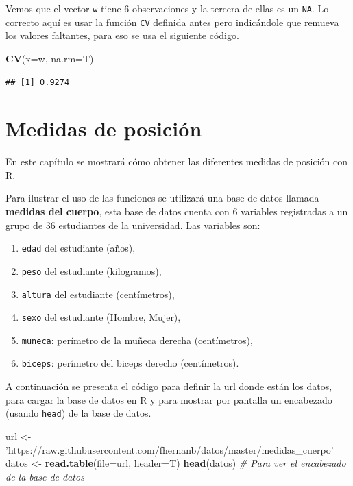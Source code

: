 \documentclass[10pt,]{krantz}
\makeatletter
\newenvironment{Shaded}{\begin{snugshade}}{\end{snugshade}}
\newcommand{\KeywordTok}[1]{\textcolor[rgb]{0.13,0.29,0.53}{\textbf{{#1}}}}
\newcommand{\DataTypeTok}[1]{\textcolor[rgb]{0.13,0.29,0.53}{{#1}}}
\newcommand{\StringTok}[1]{\textcolor[rgb]{0.31,0.60,0.02}{{#1}}}
\newcommand{\CommentTok}[1]{\textcolor[rgb]{0.56,0.35,0.01}{\textit{{#1}}}}
\newcommand{\NormalTok}[1]{{#1}}
\providecommand{\tightlist}{%
  \setlength{\itemsep}{0pt}\setlength{\parskip}{0pt}}
\let\proglang=\textsf
\newenvironment{kframe}{%
\medskip{}
\setlength{\fboxsep}{.8em}
 \def\at@end@of@kframe{}%
 \ifinner\ifhmode%
  \def\at@end@of@kframe{\end{minipage}}%
  \begin{minipage}{\columnwidth}%
 \fi\fi%
 \def\FrameCommand##1{\hskip\@totalleftmargin \hskip-\fboxsep
 \colorbox{shadecolor}{##1}\hskip-\fboxsep
     \hskip-\linewidth \hskip-\@totalleftmargin \hskip\columnwidth}%
 \MakeFramed {\advance\hsize-\width
   \@totalleftmargin\z@ \linewidth\hsize
   \@setminipage}}%
 {\par\unskip\endMakeFramed%
 \at@end@of@kframe}
\renewenvironment{Shaded}{\begin{kframe}}{\end{kframe}}
\makeatother
\begin{document}
Vemos que el vector \texttt{w} tiene 6 observaciones y la tercera de
ellas es un \texttt{NA}. Lo correcto aquí es usar la función \texttt{CV}
definida antes pero indicándole que remueva los valores faltantes, para
eso se usa el siguiente código.

\begin{Shaded}
\begin{Highlighting}[]
\KeywordTok{CV}\NormalTok{(}\DataTypeTok{x=}\NormalTok{w, }\DataTypeTok{na.rm=}\NormalTok{T)}
\end{Highlighting}
\end{Shaded}

\begin{verbatim}
## [1] 0.9274
\end{verbatim}

\chapter{\texorpdfstring{Medidas de posición
\label{posi}}{Medidas de posición }}\label{medidas-de-posicion}

En este capítulo se mostrará cómo obtener las diferentes medidas de
posición con \proglang{R}.

Para ilustrar el uso de las funciones se utilizará una base de datos
llamada \textbf{medidas del cuerpo}, esta base de datos cuenta con 6
variables registradas a un grupo de 36 estudiantes de la universidad.
Las variables son:

\begin{enumerate}
\def\labelenumi{\arabic{enumi}.}
\tightlist
\item
  \texttt{edad} del estudiante (años),
\item
  \texttt{peso} del estudiante (kilogramos),
\item
  \texttt{altura} del estudiante (centímetros),
\item
  \texttt{sexo} del estudiante (Hombre, Mujer),
\item
  \texttt{muneca}: perímetro de la muñeca derecha (centímetros),
\item
  \texttt{biceps}: perímetro del biceps derecho (centímetros).
\end{enumerate}

A continuación se presenta el código para definir la url donde están los
datos, para cargar la base de datos en R y para mostrar por pantalla un
encabezado (usando \texttt{head}) de la base de datos.

\begin{Shaded}
\begin{Highlighting}[]
\NormalTok{url <-}\StringTok{ 'https://raw.githubusercontent.com/fhernanb/datos/master/medidas_cuerpo'}
\NormalTok{datos <-}\StringTok{ }\KeywordTok{read.table}\NormalTok{(}\DataTypeTok{file=}\NormalTok{url, }\DataTypeTok{header=}\NormalTok{T)}
\KeywordTok{head}\NormalTok{(datos)  }\CommentTok{# Para ver el encabezado de la base de datos}
\end{Highlighting}
\end{Shaded}
\end{document}
